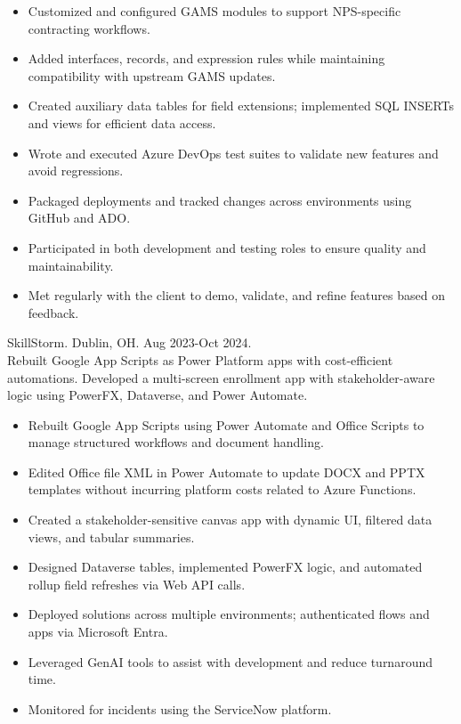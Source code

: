 \documentclass{article}
\begin{document}
\begin{description}
  \begin{itemize}
    \item Customized and configured GAMS modules to support NPS-specific contracting workflows.
    \item Added interfaces, records, and expression rules while maintaining compatibility with upstream GAMS updates.
    \item Created auxiliary data tables for field extensions; implemented SQL INSERTs and views for efficient data access.
    \item Wrote and executed Azure DevOps test suites to validate new features and avoid regressions.
    \item Packaged deployments and tracked changes across environments using GitHub and ADO.
    \item Participated in both development and testing roles to ensure quality and maintainability.
    \item Met regularly with the client to demo, validate, and refine features based on feedback.
  \end{itemize}
  \pagebreak
  \item[Power Platform Developer (Key Client: PwC)] SkillStorm. Dublin, OH. Aug 2023-Oct 2024. \\
  Rebuilt Google App Scripts as Power Platform apps with cost-efficient automations. Developed a multi-screen enrollment app with stakeholder-aware logic using PowerFX, Dataverse, and Power Automate.
  \begin{itemize}
    \item Rebuilt Google App Scripts using Power Automate and Office Scripts to manage structured workflows and document handling.
    \item Edited Office file XML in Power Automate to update DOCX and PPTX templates without incurring platform costs related to Azure Functions.
    \item Created a stakeholder-sensitive canvas app with dynamic UI, filtered data views, and tabular summaries.
    \item Designed Dataverse tables, implemented PowerFX logic, and automated rollup field refreshes via Web API calls.
    \item Deployed solutions across multiple environments; authenticated flows and apps via Microsoft Entra.
    \item Leveraged GenAI tools to assist with development and reduce turnaround time.
    \item Monitored for incidents using the ServiceNow platform.

\end{itemize}
\end{description}
\end{document}
